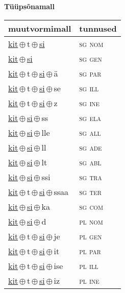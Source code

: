 

\vspace{3.5em}
\noindent \begin{minipage}{\textwidth}
\noindent \textbf{Tüüpsõnamall \,}\\

\begin{sideways}
\begin{tabular}{l l}
muutvormimall & tunnused \\
\hline
\underline{kit}\,$\oplus$\,t\,$\oplus$\,\underline{si} & \textsc{ sg nom } \\
\underline{kit}\,$\oplus$\,\underline{si} & \textsc{ sg gen } \\
\underline{kit}\,$\oplus$\,t\,$\oplus$\,\underline{si}\,$\oplus$\,ä & \textsc{ sg par } \\
\underline{kit}\,$\oplus$\,t\,$\oplus$\,\underline{si}\,$\oplus$\,se & \textsc{ sg ill } \\
\underline{kit}\,$\oplus$\,t\,$\oplus$\,\underline{si}\,$\oplus$\,z & \textsc{ sg ine } \\
\underline{kit}\,$\oplus$\,\underline{si}\,$\oplus$\,ss & \textsc{ sg ela } \\
\underline{kit}\,$\oplus$\,\underline{si}\,$\oplus$\,lle & \textsc{ sg all } \\
\underline{kit}\,$\oplus$\,\underline{si}\,$\oplus$\,ll & \textsc{ sg ade } \\
\underline{kit}\,$\oplus$\,\underline{si}\,$\oplus$\,lt & \textsc{ sg abl } \\
\underline{kit}\,$\oplus$\,\underline{si}\,$\oplus$\,ssi & \textsc{ sg tra } \\
\underline{kit}\,$\oplus$\,t\,$\oplus$\,\underline{si}\,$\oplus$\,ssaa & \textsc{ sg ter } \\
\underline{kit}\,$\oplus$\,\underline{si}\,$\oplus$\,ka & \textsc{ sg com } \\
\underline{kit}\,$\oplus$\,\underline{si}\,$\oplus$\,d & \textsc{ pl nom } \\
\underline{kit}\,$\oplus$\,t\,$\oplus$\,\underline{si}\,$\oplus$\,je & \textsc{ pl gen } \\
\underline{kit}\,$\oplus$\,t\,$\oplus$\,\underline{si}\,$\oplus$\,it & \textsc{ pl par } \\
\underline{kit}\,$\oplus$\,t\,$\oplus$\,\underline{si}\,$\oplus$\,ise & \textsc{ pl ill } \\
\underline{kit}\,$\oplus$\,t\,$\oplus$\,\underline{si}\,$\oplus$\,iz & \textsc{ pl ine } \\

\end{tabular}
\end{sideways}
\end{minipage}
